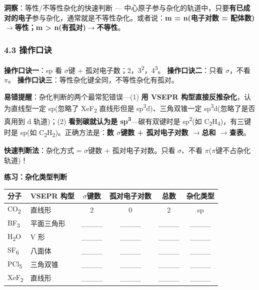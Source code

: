 \documentclass[a4paper,11pt]{ctexart}
\newcounter{none}
\newcommand{\箭}{\ensuremath{\rightarrow}}
\newcommand{\左箭}{\ensuremath{\leftarrow}}
\newcommand{\上箭}{\ensuremath{\uparrow}}
\newcommand{\下箭}{\ensuremath{\downarrow}}
\newcommand{\衡}{\ensuremath{\rightleftharpoons}}
\newcommand{\双箭}{\ensuremath{\leftrightarrow}}
\newcommand{\约等于}{\ensuremath{\approx}}
\newcommand{\小于等于}{\ensuremath{\leq}}
\newcommand{\大于等于}{\ensuremath{\geq}}
\newcommand{\不等于}{\ensuremath{\neq}}
\newcommand{\西格马}{\ensuremath{\sigma}}
\newcommand{\派}{\ensuremath{\pi}}
\begin{document}
\textbf{洞察}：等性/不等性杂化的快速判断 --- 中心原子参与杂化的轨道中，只要\textbf{有已成对的电子}参与杂化，通常就是不等性杂化。或者说：\textbf{m = n(电子对数 = 配体数)\箭 等性；m \textgreater{} n(有孤对)\箭 不等性}。

\subsubsection{4.3 操作口诀}\label{ux64cdux4f5cux53e3ux8bc0}

\textbf{操作口诀一}：sp 看 \西格马 键 + 孤对电子数；2，3\textsuperscript{2}，4\textsuperscript{3}。
\textbf{操作口诀二}：只看 \西格马，不看 \派。
\textbf{操作口诀三}：等性杂化键全同，不等性杂化有孤对。

\textbf{易错提醒}：杂化判断的两个最常犯错误---(1) \textbf{用 VSEPR 构型直接反推杂化}，认为直线型一定 sp(忽略了 XeF\textsubscript{2} 直线形但是 sp\textsuperscript{3}d)、三角双锥一定 sp\textsuperscript{3}d(忽略了是否真用到 d 轨道)；(2) \textbf{看到碳就认为是 sp\textsuperscript{3}}---碳有双键时是 sp\textsuperscript{2}(如 C\textsubscript{2}H\textsubscript{4})，有三键时是 sp(如 C\textsubscript{2}H\textsubscript{2})。正确方法是：\textbf{数 \西格马 键数 + 孤对电子对数 \箭 总和 \箭 查表}。

\textbf{快速判断法}：杂化方式 = \西格马 键数 + 孤对电子对数。只看 \西格马、不看 \派(\派 键不占杂化轨道)！

\textbf{练习：杂化类型判断}

{\def\LTcaptype{none} %
\begin{longtable}[]{@{}llcccc@{}}
\toprule\noalign{}
分子 & VSEPR 构型 & \西格马 键数 & 孤对电子对数 & 总数 & 杂化类型 \\
\midrule\noalign{}
\endhead
\bottomrule\noalign{}
\endlastfoot
CO\textsubscript{2} & 直线形 & 2 & 0 & 2 & sp \\
BF\textsubscript{3} & 平面三角形 & \_\_\_\_ & \_\_\_\_ & \_\_\_\_ & \_\_\_\_ \\
H\textsubscript{2}O & V 形 & \_\_\_\_ & \_\_\_\_ & \_\_\_\_ & \_\_\_\_ \\
SF\textsubscript{6} & 八面体 & \_\_\_\_ & \_\_\_\_ & \_\_\_\_ & \_\_\_\_ \\
PCl\textsubscript{5} & 三角双锥 & \_\_\_\_ & \_\_\_\_ & \_\_\_\_ & \_\_\_\_ \\
XeF\textsubscript{2} & 直线形 & \_\_\_\_ & \_\_\_\_ & \_\_\_\_ & \_\_\_\_ \\
\end{longtable}
}
\end{document}
